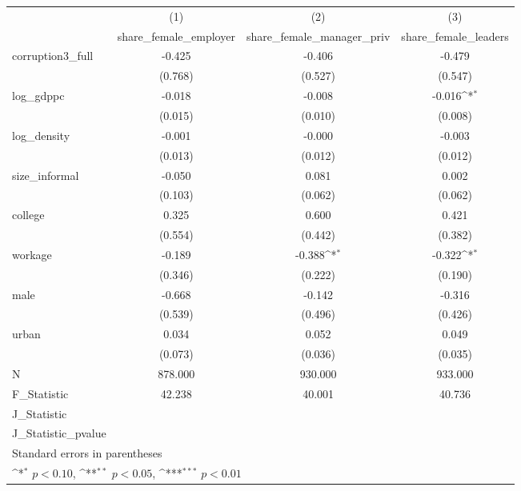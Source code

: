 {
\def\sym#1{\ifmmode^{#1}\else\(^{#1}\)\fi}
\begin{tabular}{l*{3}{c}}
\hline\hline
            &\multicolumn{1}{c}{(1)}&\multicolumn{1}{c}{(2)}&\multicolumn{1}{c}{(3)}\\
            &\multicolumn{1}{c}{share\_female\_employer}&\multicolumn{1}{c}{share\_female\_manager\_priv}&\multicolumn{1}{c}{share\_female\_leaders}\\
\hline
corruption3\_full&      -0.425         &      -0.406         &      -0.479         \\
            &     (0.768)         &     (0.527)         &     (0.547)         \\
[1em]
log\_gdppc   &      -0.018         &      -0.008         &      -0.016\sym{*}  \\
            &     (0.015)         &     (0.010)         &     (0.008)         \\
[1em]
log\_density &      -0.001         &      -0.000         &      -0.003         \\
            &     (0.013)         &     (0.012)         &     (0.012)         \\
[1em]
size\_informal&      -0.050         &       0.081         &       0.002         \\
            &     (0.103)         &     (0.062)         &     (0.062)         \\
[1em]
college     &       0.325         &       0.600         &       0.421         \\
            &     (0.554)         &     (0.442)         &     (0.382)         \\
[1em]
workage     &      -0.189         &      -0.388\sym{*}  &      -0.322\sym{*}  \\
            &     (0.346)         &     (0.222)         &     (0.190)         \\
[1em]
male        &      -0.668         &      -0.142         &      -0.316         \\
            &     (0.539)         &     (0.496)         &     (0.426)         \\
[1em]
urban       &       0.034         &       0.052         &       0.049         \\
            &     (0.073)         &     (0.036)         &     (0.035)         \\
\hline
N           &     878.000         &     930.000         &     933.000         \\
F\_Statistic &      42.238         &      40.001         &      40.736         \\
J\_Statistic &                     &                     &                     \\
J\_Statistic\_pvalue&                     &                     &                     \\
\hline\hline
\multicolumn{4}{l}{\footnotesize Standard errors in parentheses}\\
\multicolumn{4}{l}{\footnotesize \sym{*} \(p<0.10\), \sym{**} \(p<0.05\), \sym{***} \(p<0.01\)}\\
\end{tabular}
}
